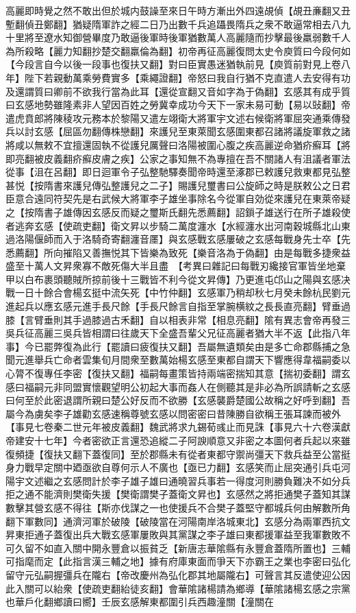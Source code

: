 高麗即時覺之然不敢出但於城内鼓譟至來日午時方漸出外四遠覘偵【覘丑亷翻又丑塹翻偵丑鄭翻】猶疑隋軍詐之經二日乃出數千兵追躡畏隋兵之衆不敢逼常相去八九十里將至遼水知御營畢度乃敢逼後軍時後軍猶數萬人高麗隨而抄擊最後羸弱數千人為所殺略【麗力知翻抄楚交翻羸倫為翻】初帝再征高麗復問太史令庾質曰今段何如【今段言自今以後一段事也復扶又翻】對曰臣實愚迷猶執前見【庾質前對見上卷八年】陛下若親動萬乘勞費實多【乘繩證翻】帝怒曰我自行猶不克直遣人去安得有功及還謂質曰卿前不欲我行當為此耳【還從宣翻又音如字為于偽翻】玄感其有成乎質曰玄感地勢雖隆素非人望因百姓之勞冀幸成功今天下一家未易可動【易以䜴翻】帝遣虎賁郎將陳稜攻元務本於黎陽又遣左翊衛大將軍宇文述右候衛將軍屈突通乘傳發兵以討玄感【屈區勿翻傳株戀翻】來護兒至東萊聞玄感圍東都召諸將議旋軍救之諸將咸以無敕不宜擅還固執不從護兒厲聲曰洛陽被圍心腹之疾高麗逆命猶疥癬耳【將即亮翻被皮義翻疥癬皮膚之疾】公家之事知無不為專擅在吾不關諸人有沮議者軍法從事【沮在呂翻】即日迴軍令子弘整馳驛奏聞帝時還至涿郡已敕護兒救東都見弘整甚悦【按隋書來護兒傳弘整護兒之二子】賜護兒璽書曰公旋師之時是朕敕公之日君臣意合遠同符契先是右武候大將軍李子雄坐事除名今從軍自効從來護兒在東萊帝疑之【按隋書子雄傳因玄感反而疑之璽斯氏翻先悉薦翻】詔鎻子雄送行在所子雄殺使者逃奔玄感【使疏吏翻】衛文昇以步騎二萬度瀍水【水經瀍水出河南穀城縣北山東過洛陽偃師而入于洛騎奇寄翻瀍音㕓】與玄感戰玄感屢破之玄感每戰身先士卒【先悉薦翻】所向摧陷又善撫悦其下皆樂為致死【樂音洛為于偽翻】由是每戰多捷衆益盛至十萬人文昇衆寡不敵死傷大半且盡　【考異曰雜記曰每戰刃纔接官軍皆坐地棄甲以白布裹頭聽賊所掠前後十三戰皆不利今從文昇傳】乃更進屯邙山之陽與玄感决戰一日十餘合會楊玄挺中流矢死【中竹仲翻】玄感軍乃稍却秋七月癸未餘杭民劉元進起兵以應玄感元進手長尺餘【手長尺餘言自指至掌腕横紋之長長直亮翻】臂垂過膝【言臂垂則其手過膝過古禾翻】自以相表非常【相息亮翻】隂有異志會帝再發三吳兵征高麗三吳兵皆相謂曰往歲天下全盛吾輩父兄征高麗者猶大半不返【此指八年事】今已罷弊復為此行【罷讀曰疲復扶又翻】吾屬無遺類矣由是多亡命郡縣捕之急聞元進舉兵亡命者雲集旬月間衆至數萬始楊玄感至東都自謂天下響應得韋福嗣委以心膂不復專任李密【復扶又翻】福嗣每畫策皆持兩端密揣知其意【揣初委翻】謂玄感曰福嗣元非同盟實懷觀望明公初起大事而姦人在側聽其是非必為所誤請斬之玄感曰何至於此密退謂所親曰楚公好反而不欲勝【玄感襲爵楚國公故稱之好呼到翻】吾屬今為虜矣李子雄勸玄感速稱尊號玄感以問密密曰昔陳勝自欲稱王張耳諫而被外【事見七卷秦二世元年被皮義翻】魏武將求九錫荀彧止而見誅【事見六十六卷漢獻帝建安十七年】今者密欲正言還恐追縱二子阿諛順意又非密之本圖何者兵起以來雖復頻捷【復扶又翻下蓋復同】至於郡縣未有從者東都守禦尚彊天下救兵益至公當挺身力戰早定關中廼亟欲自尊何示人不廣也【亟已力翻】玄感笑而止屈突通引兵屯河陽宇文述繼之玄感問計於李子雄子雄曰通曉習兵事若一得度河則勝負難决不如分兵拒之通不能濟則樊衛失援【樊衛謂樊子蓋衛文昇也】玄感然之將拒通樊子蓋知其謀數擊其營玄感不得往【斯亦伐謀之一也使援兵不合樊子蓋堅守都城兵何由解數所角翻下軍數同】通濟河軍於破陵【破陵當在河陽南岸洛城東北】玄感分為兩軍西抗文昇東拒通子蓋復出兵大戰玄感軍屢敗與其黨謀之李子雄曰東都援軍益至我軍數敗不可久留不如直入關中開永豐倉以振貧乏【新唐志華隂縣有永豐倉蓋隋所置也】三輔可指麾而定【此指言漢三輔之地】據有府庫東面而爭天下亦霸王之業也李密曰弘化留守元弘嗣握彊兵在隴右【帝改慶州為弘化郡其地屬隴右】可聲言其反遣使迎公因此入關可以紿衆【使疏吏翻紿徒亥翻】會華隂諸楊請為鄉導【華隂諸楊玄感之宗黨也華戶化翻鄉讀曰嚮】壬辰玄感解東都圍引兵西趣潼關【潼關在